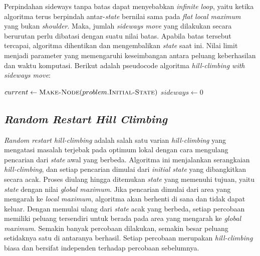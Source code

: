 Perpindahan sideways tanpa batas dapat menyebabkan \textit{infinite loop}, yaitu ketika algoritma terus berpindah antar-\textit{state} bernilai sama pada \textit{flat local maximum} yang bukan \textit{shoulder}. Maka, jumlah \textit{sideways move} yang dilakukan secara berurutan perlu dibatasi dengan suatu nilai batas. Apabila batas tersebut tercapai, algoritma dihentikan dan mengembalikan \textit{state} saat ini. Nilai limit menjadi parameter yang memengaruhi keseimbangan antara peluang keberhasilan dan waktu komputasi. Berikut adalah pseudocode algoritma \textit{hill-climbing with sideways move}:

\begin{algorithm}[H]
\caption{Hill-Climbing dengan Sideways Move}
\label{alg:hill-climbing-sideways}
$current \gets \textsc{Make-Node}(problem.\textsc{Initial-State})$\;
$sideways \gets 0$\;
\end{algorithm}

\subsection{\textit{Random Restart Hill Climbing}}

\textit{Random restart hill-climbing} adalah salah satu varian \textit{hill-climbing} yang mengatasi masalah terjebak pada optimum lokal dengan cara mengulang pencarian dari \textit{state} awal yang berbeda. Algoritma ini menjalankan serangkaian \textit{hill-climbing}, dan setiap pencarian dimulai dari \textit{initial state} yang dibangkitkan secara acak. Proses diulang hingga ditemukan \textit{state} yang memenuhi tujuan, yaitu \textit{state} dengan nilai \textit{global maximum}. Jika pencarian dimulai dari area yang mengarah ke \textit{local maximum}, algoritma akan berhenti di sana dan tidak dapat keluar. Dengan memulai ulang dari \textit{state} acak yang berbeda, setiap percobaan memiliki peluang tersendiri untuk berada pada area yang mengarah ke \textit{global maximum}. Semakin banyak percobaan dilakukan, semakin besar peluang setidaknya satu di antaranya berhasil. Setiap percobaan merupakan \textit{hill-climbing} biasa dan bersifat independen terhadap percobaan sebelumnya.

